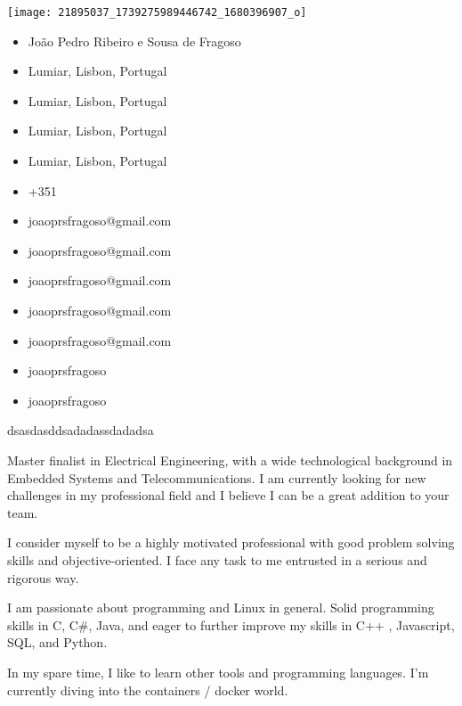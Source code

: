 \documentclass[11pt, a4paper]{cv}
\begin{document}

\begin{minipage}{0.3\linewidth}
    \texttt{[image: 21895037\_1739275989446742\_1680396907\_o]}
    \label{fig:joaoprsfragoso}
\end{minipage}\hfil
\begin{minipage}{0.55\linewidth}
\begin{itemize}
	\item \faUser \space João Pedro Ribeiro e Sousa de Fragoso
	\item \faHome \space Lumiar, Lisbon, Portugal
	\item \faFlag \space Lumiar, Lisbon, Portugal
	\item \faLocationArrow \space Lumiar, Lisbon, Portugal
	\item \faMapMarker \space Lumiar, Lisbon, Portugal
	\item \faPhone \space +351 
	\item \faEnvelopeO \space joaoprsfragoso@gmail.com
	\item \faEnvelope \space joaoprsfragoso@gmail.com
	\item \faEnvelopeSquare \space joaoprsfragoso@gmail.com
	\item \faGoogle \space joaoprsfragoso@gmail.com
	\item \faInbox \space joaoprsfragoso@gmail.com
	\item \faLinkedinSquare \space joaoprsfragoso
	\item \faSkype \space joaoprsfragoso
\end{itemize}
\end{minipage}


dsasdasddsadadassdadadsa

\aboutme
{

	\faQuoteLeft \space Master finalist in Electrical Engineering, with a wide technological background in Embedded Systems and Telecommunications. I am currently looking for new challenges in my professional field and I believe I can be a great addition to your team.

	I consider myself to be a highly motivated professional with good problem solving skills and objective-oriented. I face any task to me entrusted in a serious and rigorous way.

	I am passionate about programming and Linux in general. Solid programming skills in C, C\#, Java, and eager to further improve my skills in C++ , Javascript, SQL, and Python. 

	In my spare time, I like to learn other tools and programming languages. I'm currently diving into the containers / docker world. \faQuoteRight

}
\end{document}

